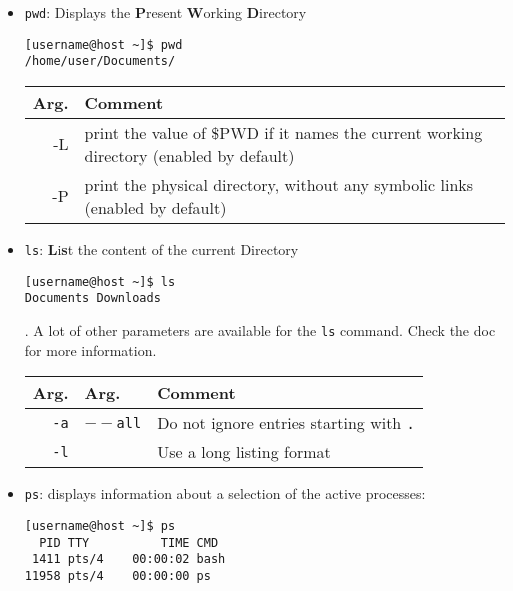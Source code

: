 \documentclass{article}
\newcommand{\inlinecode}[1]{\colorbox{backcolour}{\footnotesize{\texttt{#1}}}}
\begin{document}
\begin{itemize}
	\item \inlinecode{pwd}: Displays the \textbf{P}resent \textbf{W}orking \textbf{D}irectory
	      \begin{paracol}{2}
		      \begin{lstlisting}[style=terminal]
[username@host ~]$ pwd
/home/user/Documents/
\end{lstlisting}
		      \switchcolumn
		      \footnotesize{
			      \begin{tabularx}{\linewidth}{| r |>{\raggedright\arraybackslash}X |}\hline
				      \textbf{Arg.} & \textbf{Comment}                                                                        \\\hline
				      -L            & print the value of \$PWD if it names the current working directory (enabled by default) \\\hline
				      -P            & print the physical directory, without any symbolic links (enabled by default)           \\\hline
			      \end{tabularx}}
	      \end{paracol}

	\item \inlinecode{ls}: \textbf{L}i\textbf{s}t the content of the current Directory
	      \begin{paracol}{2}
		      \begin{lstlisting}[style=terminal]
[username@host ~]$ ls
Documents Downloads
\end{lstlisting}
		      \faWarning. A lot of other parameters are available for the \inlinecode{ls} command. Check the doc for more information.
		      \switchcolumn
		      \footnotesize{
			      \begin{tabularx}{\linewidth}{| r |>{\raggedright\arraybackslash}X | >{\raggedright\arraybackslash}X |}\hline
				      \textbf{Arg.}   & \textbf{Arg.}          & \textbf{Comment}                                   \\\hline
				      \inlinecode{-a} & \inlinecode{\(--\)all} & Do not ignore entries starting with \inlinecode{.} \\\hline
				      \inlinecode{-l} &                        & Use a long listing format                          \\\hline
			      \end{tabularx}}
	      \end{paracol}

	\item \inlinecode{ps}: displays information about a selection of the active processes:
	      \begin{lstlisting}[style=terminal]
[username@host ~]$ ps
  PID TTY          TIME CMD
 1411 pts/4    00:00:02 bash
11958 pts/4    00:00:00 ps
\end{lstlisting}


\end{itemize}
\end{document}
